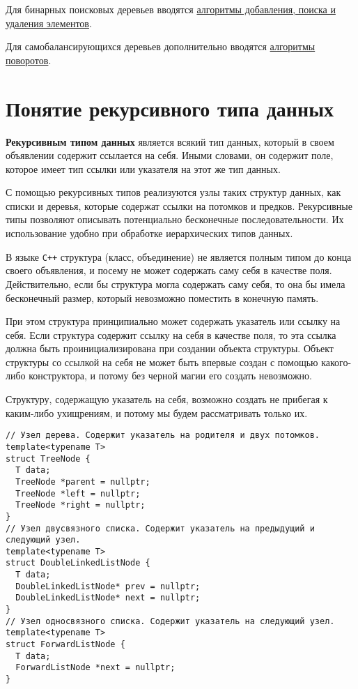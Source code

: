 Для бинарных поисковых деревьев вводятся \hyperref[sec:tree-node-ops]{алгоритмы добавления, поиска и удаления элементов}.

Для самобалансирующихся деревьев дополнительно вводятся \hyperref[sec:rotations]{алгоритмы поворотов}.

\section{Понятие рекурсивного типа данных}
\textbf{Рекурсивным типом данных} является всякий тип данных, который в своем объявлении содержит ссылается
на себя. Иными словами, он содержит поле, которое имеет тип ссылки или указателя на этот же тип данных.

С помощью рекурсивных типов реализуются узлы таких структур данных, как списки и деревья, которые
содержат ссылки на потомков и предков. Рекурсивные типы позволяют описывать потенциально бесконечные
последовательности. Их использование удобно при обработке иерархических типов данных.

В языке \verb|C++| структура (класс, объединение) не является полным типом до конца
своего объявления, и посему не может содержать саму себя в качестве поля. Действительно, если бы структура
могла содержать саму себя, то она бы имела бесконечный размер, который невозможно поместить в конечную память.

При этом структура принципиально может содержать указатель или ссылку на себя. Если структура содержит ссылку на себя
в качестве поля, то эта ссылка должна быть проинициализирована при создании объекта структуры. Объект структуры со
ссылкой на себя не может быть впервые создан с помощью какого-либо конструктора, и потому без черной магии его
создать невозможно.

Структуру, содержащую указатель на себя, возможно создать не прибегая к каким-либо ухищрениям,
и потому мы будем рассматривать только их.

\begin{verbatim}
// Узел дерева. Содержит указатель на родителя и двух потомков.
template<typename T>
struct TreeNode {
  T data;
  TreeNode *parent = nullptr;
  TreeNode *left = nullptr;
  TreeNode *right = nullptr;
}
// Узел двусвязного списка. Содержит указатель на предыдущий и следующий узел.
template<typename T>
struct DoubleLinkedListNode {
  T data;
  DoubleLinkedListNode* prev = nullptr;
  DoubleLinkedListNode* next = nullptr;
}
// Узел односвязного списка. Содержит указатель на следующий узел.
template<typename T>
struct ForwardListNode {
  T data;
  ForwardListNode *next = nullptr;
}
\end{verbatim}


